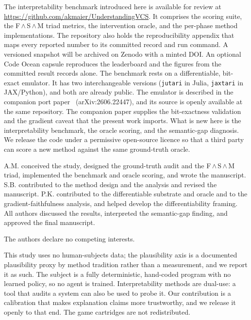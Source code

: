 The interpretability benchmark introduced here is available for review at
\url{https://github.com/akmaier/UnderstandingVCS}. It comprises the scoring suite, the
F\,$\wedge$\,S\,$\wedge$\,M triad metrics, the intervention oracle, and the per-phase
method implementations. The repository also holds the
reproducibility appendix that maps every reported number to its committed record and run
command. A versioned snapshot will be archived on Zenodo with a minted DOI. An optional
Code Ocean capsule reproduces the leaderboard and the figures from the committed result
records alone. The benchmark rests on a differentiable, bit-exact emulator. It has two
interchangeable versions (\texttt{jutari} in Julia, \texttt{jaxtari} in JAX/Python), and
both are already public. The emulator is described in the companion port
paper~\cite{maier2025vcs} (arXiv:2606.22447), and its source is openly available at the
same repository. The companion paper supplies the bit-exactness validation and the
gradient caveat that the present work imports. What is new here is the interpretability
benchmark, the oracle scoring, and the semantic-gap diagnosis. We release the code
under a permissive open-source licence so that a third party can score a new method
against the same ground-truth oracle.

A.M. conceived the study, designed the ground-truth audit and the
F\,$\wedge$\,S\,$\wedge$\,M triad, implemented the benchmark and oracle scoring, and
wrote the manuscript. S.B. contributed to the method design and the analysis and
revised the manuscript. P.K. contributed to the differentiable substrate and oracle
and to the gradient-faithfulness analysis, and helped develop the differentiability
framing. All authors discussed the results, interpreted the semantic-gap finding, and
approved the final manuscript.

The authors declare no competing interests.

This study uses no human-subjects data; the plausibility axis is a documented
plausibility proxy by method tradition rather than a measurement, and we report it as
such. The subject is a fully deterministic, hand-coded program with no learned policy, so no
agent is trained. Interpretability methods are dual-use: a tool that audits a
system can also be used to probe it. Our contribution is a calibration that makes
explanation claims more trustworthy, and we release it openly to that end.
The game cartridges are not redistributed.

